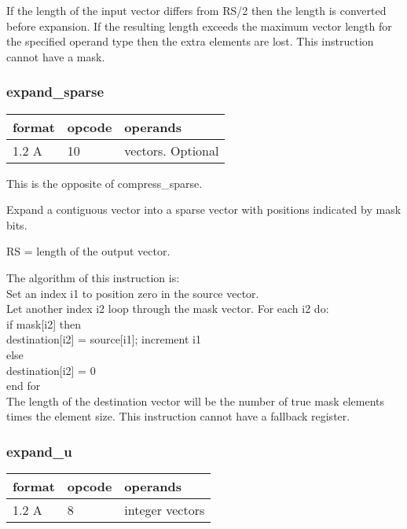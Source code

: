 \documentclass[forwardcom.tex]{subfiles}
\begin{document}
If the length of the input vector differs from RS/2 then the length is converted before expansion. If the resulting length exceeds the maximum vector length for the specified operand type then the extra elements are lost. This instruction cannot have a mask.
\vspace{2mm}

\subsubsection{expand\_sparse}
\label{table:expandSparseInstruction}
\begin{tabular}{|p{12mm}|p{12mm}|p{110mm}|}
\hline
\bfseries format & \bfseries opcode & \bfseries operands \\ \hline
1.2 A & 10 & vectors. Optional \\ \hline
\end{tabular}
\vspace{2mm}

This is the opposite of compress\_sparse.

Expand a contiguous vector into a sparse vector with positions indicated by mask bits. 

RS = length of the output vector.

\vspace{2mm}
The algorithm of this instruction is:\\
Set an index i1 to position zero in the source vector.\\
Let another index i2 loop through the mask vector. For each i2 do:\\
\hspace{4mm} if mask[i2] then\\
\hspace{8mm}   destination[i2] = source[i1]; increment i1\\
\hspace{4mm} else\\
\hspace{8mm}   destination[i2] = 0\\
  end for\\
  
\vspace{2mm}
The length of the destination vector will be the number of true mask elements
times the element size. This instruction cannot have a fallback register.
\vspace{2mm}

\subsubsection{expand\_u}
\label{table:expandUsInstruction}
\begin{tabular}{|p{12mm}|p{12mm}|p{110mm}|}
\hline
\bfseries format & \bfseries opcode & \bfseries operands \\ \hline
1.2 A & 8 & integer vectors  \\ \hline
\end{tabular}
\vspace{2mm}
\end{document}

